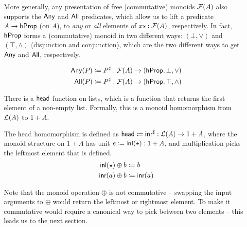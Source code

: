 More generally, any presentation of free (commutative) monoids $\mathcal{F}(A)$ also supports the
$\operatorname{\mathsf{Any}}$ and $\operatorname{\mathsf{All}}$ predicates, which allow us to lift a predicate $A \to \mathsf{hProp}$ (on $A$),
to \emph{any} or \emph{all} elements of $xs : \mathcal{F}(A)$, respectively.
%
In fact, $\mathsf{hProp}$ forms a (commutative) monoid in two different ways: $(\bot,\vee)$ and $(\top,\wedge)$
(disjunction and conjunction), which are the two different ways to get $\operatorname{\mathsf{Any}}$ and $\operatorname{\mathsf{All}}$, respectively.
\begin{definition}
      \label{def:any-all}
      \begin{align*}
            \mathsf{Any}(P) & \mathrel{\coloneq} {P}^{\sharp} : \mathcal{F}(A) \to (\mathsf{hProp}, \bot, \vee)   \\
            \mathsf{All}(P) & \mathrel{\coloneq} {P}^{\sharp} : \mathcal{F}(A) \to (\mathsf{hProp}, \top, \wedge)
      \end{align*}
\end{definition}

There is a $\operatorname{\mathsf{head}}$ function on lists, which is a function that returns the first element of a non-empty list.
%
Formally, this is a monoid homomorphism from $\mathcal{L}(A)$ to $1 + A$.

\begin{definition}
      \label{def:head-free-monoid}
      The head homomorphism is defined as
      \(
      \operatorname{\mathsf{head}} \mathrel{\coloneq} {\operatorname{\mathsf{inr}}}^{\sharp} : \mathcal{L}(A) \to 1 + A
      \),
      where the monoid structure on $1 + A$ has unit
      \(
      e \mathrel{\coloneq} \operatorname{\mathsf{inl}}(\star) : 1 + A
      \),
      and multiplication picks the leftmost element that is defined.
      \[
            \begin{aligned}
                  \operatorname{\mathsf{inl}}(\star) \oplus b & \mathrel{\coloneq} b       \\
                  \operatorname{\mathsf{inr}}(a) \oplus b    & \mathrel{\coloneq} \operatorname{\mathsf{inr}}(a) \\
            \end{aligned}
      \]
\end{definition}

Note that the monoid operation $\oplus$ is not commutative --
swapping the input arguments to $\oplus$ would return the leftmost or rightmost element.
%
To make it commutative would require a canonical way to pick between two elements --
this leads us to the next section.
